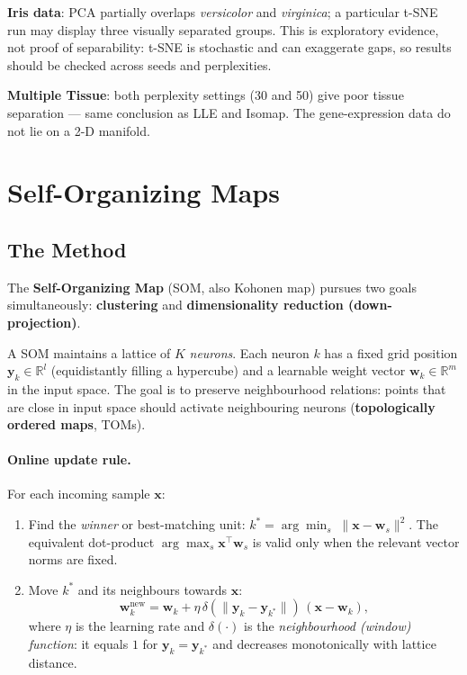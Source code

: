 \documentclass[11pt, oneside]{book}
\newcommand{\T}{^{\top}}
\begin{document}
\textbf{Iris data}: PCA partially overlaps \textit{versicolor} and \textit{virginica};
a particular t-SNE run may display three visually separated groups. This is exploratory
evidence, not proof of separability: t-SNE is stochastic and can exaggerate gaps, so
results should be checked across seeds and perplexities.

\textbf{Multiple Tissue}: both perplexity settings (30 and 50) give poor
tissue separation — same conclusion as LLE and Isomap.
The gene-expression data do not lie on a 2-D manifold.

\section{Self-Organizing Maps}

\subsection{The Method}

The \textbf{Self-Organizing Map} (SOM, also Kohonen map) pursues two goals
simultaneously: \textbf{clustering} and \textbf{dimensionality reduction
(down-projection)}.

A SOM maintains a lattice of $K$ \emph{neurons}.
Each neuron $k$ has a fixed grid position $\bm{y}_k\in\mathbb{R}^l$
(equidistantly filling a hypercube) and a learnable weight vector
$\bm{w}_k\in\mathbb{R}^m$ in the input space.
The goal is to preserve neighbourhood relations: points that are close in
input space should activate neighbouring neurons (\textbf{topologically
ordered maps}, TOMs).

\paragraph{Online update rule.}
For each incoming sample $\bm{x}$:
\begin{enumerate}
  \item Find the \emph{winner} or best-matching unit:
        $k^* = \arg\min_s\;\|\bm{x}-\bm{w}_s\|^2$.
        The equivalent dot-product $\arg\max_s\bm{x}\T\bm{w}_s$ is valid only
        when the relevant vector norms are fixed.
  \item Move $k^*$ and its neighbours towards $\bm{x}$:
        \[
          \bm{w}_k^{\text{new}}
          = \bm{w}_k + \eta\,\delta(\|\bm{y}_k - \bm{y}_{k^*}\|)\,
            (\bm{x} - \bm{w}_k),
        \]
        where $\eta$ is the learning rate and $\delta(\cdot)$ is the
        \emph{neighbourhood (window) function}: it equals $1$ for
        $\bm{y}_k=\bm{y}_{k^*}$ and decreases monotonically with lattice
        distance.
\end{enumerate}
\end{document}
